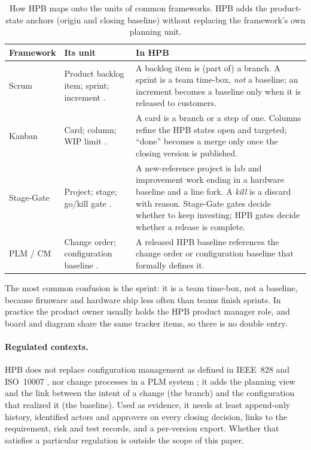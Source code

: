 \begin{table}[tbp]
  \centering
  \small
  \caption{How HPB maps onto the units of common frameworks. HPB adds the
    product-state anchors (origin and closing baseline) without replacing
    the framework's own planning unit.}
  \label{tab:coexistence}
  \begin{tabularx}{\linewidth}{@{}>{\raggedright\arraybackslash}p{2.0cm}
                                  >{\raggedright\arraybackslash}X
                                  >{\raggedright\arraybackslash}X@{}}
    \toprule
    \textbf{Framework} & \textbf{Its unit} & \textbf{In HPB} \\
    \midrule
    Scrum
      & Product backlog item; sprint; increment \citep{schwaber2020scrum}.
      & A backlog item is (part of) a branch. A sprint is a team time-box,
        \emph{not} a baseline; an increment becomes a baseline only when it
        is released to customers. \\
    \addlinespace
    Kanban
      & Card; column; WIP limit \citep{anderson2010kanban}.
      & A card is a branch or a step of one. Columns refine the HPB states
        open and targeted; ``done'' becomes a merge only once the closing
        version is published. \\
    \addlinespace
    Stage-Gate
      & Project; stage; go/kill gate \citep{cooper1990stagegate}.
      & A new-reference project is lab and improvement work ending in a
        hardware baseline and a line fork. A \emph{kill} is a discard with
        reason. Stage-Gate gates decide whether to keep investing; HPB
        gates decide whether a release is complete. \\
    \addlinespace
    PLM / CM
      & Change order; configuration baseline \citep{stark2015plm,iso10007}.
      & A released HPB baseline references the change order or
        configuration baseline that formally defines it. \\
    \bottomrule
  \end{tabularx}
\end{table}

The most common confusion is the sprint: it is a team time-box, not a
baseline, because firmware and hardware ship less often than teams finish
sprints. In practice the product owner usually holds the HPB product
manager role, and board and diagram share the same tracker items, so
there is no double entry.

\paragraph{Regulated contexts.}
HPB does not replace configuration management as defined in IEEE~828 and
ISO~10007 \citep{ieee828,iso10007}, nor change processes in a PLM system
\citep{stark2015plm}; it adds the planning view and the link between the
intent of a change (the branch) and the configuration that realized it
(the baseline). Used as evidence, it needs at least append-only history,
identified actors and approvers on every closing decision, links to the
requirement, risk and test records, and a per-version export. Whether
that satisfies a particular regulation is outside the scope of this paper.

